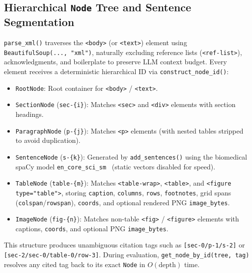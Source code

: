 \subsection{Hierarchical \texttt{Node} Tree and Sentence Segmentation}
\texttt{parse\_xml()} traverses the \texttt{<body>} (or \texttt{<text>}) element using \texttt{BeautifulSoup(..., "xml")}, naturally excluding reference lists (\texttt{<ref-list>}), acknowledgments, and boilerplate to preserve LLM context budget. Every element receives a deterministic hierarchical ID via \texttt{construct\_node\_id()}:
\begin{itemize}
    \item \texttt{RootNode}: Root container for \texttt{<body>} / \texttt{<text>}.
    \item \texttt{SectionNode} (\texttt{sec-\{i\}}): Matches \texttt{<sec>} and \texttt{<div>} elements with section headings.
    \item \texttt{ParagraphNode} (\texttt{p-\{j\}}): Matches \texttt{<p>} elements (with nested tables stripped to avoid duplication).
    \item \texttt{SentenceNode} (\texttt{s-\{k\}}): Generated by \texttt{add\_sentences()} using the biomedical spaCy model \texttt{en\_core\_sci\_sm}~\cite{scispacy2019} (static vectors disabled for speed).
    \item \texttt{TableNode} (\texttt{table-\{m\}}): Matches \texttt{<table-wrap>}, \texttt{<table>}, and \texttt{<figure type="table">}, storing \texttt{caption}, \texttt{columns}, \texttt{rows}, \texttt{footnotes}, grid spans (\texttt{colspan}/\texttt{rowspan}), \texttt{coords}, and optional rendered PNG \texttt{image\_bytes}.
    \item \texttt{ImageNode} (\texttt{fig-\{n\}}): Matches non-table \texttt{<fig>} / \texttt{<figure>} elements with captions, \texttt{coords}, and optional PNG \texttt{image\_bytes}.
\end{itemize}

This structure produces unambiguous citation tags such as \texttt{[sec-0/p-1/s-2]} or \texttt{[sec-2/sec-0/table-0/row-3]}. During evaluation, \texttt{get\_node\_by\_id(tree, tag)} resolves any cited tag back to its exact \texttt{Node} in $O(\text{depth})$ time.

